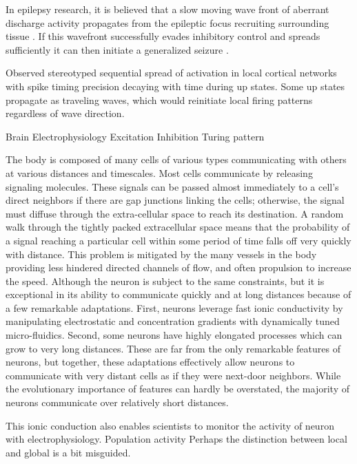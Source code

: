 In epilepsy research, it is believed that a slow moving wave front of aberrant discharge activity propagates from the epileptic focus recruiting surrounding tissue \citep{Schevon2012, Weiss2013, Martinet2015, Martinet2017, Smith2016a, Eissa2016}. If this wavefront successfully evades inhibitory control and spreads sufficiently it can then initiate a generalized seizure \citep{Schevon2012}.

Observed stereotyped sequential spread of activation in local cortical networks with spike timing precision decaying with time during up states. Some up states propagate as traveling waves, which would reinitiate local firing patterns regardless of wave direction.
\citep{Luczak2007}


Brain Electrophysiology Excitation Inhibition Turing pattern

The body is composed of many cells of various types communicating with others at various distances and timescales. Most cells communicate by releasing signaling molecules. These signals can be passed almost immediately to a cell’s direct neighbors if there are gap junctions linking the cells; otherwise, the signal must diffuse through the extra-cellular space to reach its destination. A random walk through the tightly packed extracellular space means that the probability of a signal reaching a particular cell within some period of time falls off very quickly with distance. This problem is mitigated by the many vessels in the body providing less hindered directed channels of flow, and often propulsion to increase the speed. Although the neuron is subject to the same constraints, but it is exceptional in its ability to communicate quickly and at long distances because of a few remarkable adaptations. First, neurons leverage fast ionic conductivity by manipulating electrostatic and concentration gradients with dynamically tuned micro-fluidics. Second, some neurons have highly elongated processes which can grow to very long distances. These are far from the only remarkable features of neurons, but together, these adaptations effectively allow neurons to communicate with very distant cells as if they were next-door neighbors. While the evolutionary importance of features can hardly be overstated, the majority of neurons communicate over relatively short distances.

This ionic conduction also enables scientists to monitor the activity of neuron with electrophysiology. Population activity 
Perhaps the distinction between local and global is a bit misguided. 

